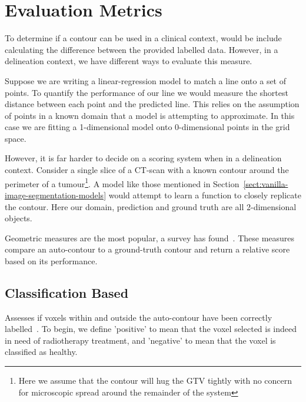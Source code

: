 \documentclass[11pt,twoside]{report}
\begin{document}


\chapter{Evaluation Metrics}\label{sect:evaluation-metrics}

To determine if a contour can be used in a clinical context, would be include calculating the difference between the provided labelled data. However, in a delineation context, we have different ways to evaluate this measure.

Suppose we are writing a linear-regression model to match a line onto a set of points. To quantify the performance of our line we would measure the shortest distance between each point and the predicted line. This relies on the assumption of points in a known domain that a model is attempting to approximate. In this case we are fitting a 1-dimensional model onto 0-dimensional points in the grid space.

However, it is far harder to decide on a scoring system when in a delineation context. Consider a single slice of a CT-scan with a known contour around the perimeter of a tumour\footnote{Here we assume that the contour will hug the GTV tightly with no concern for microscopic spread around the remainder of the system}. A model like those mentioned in Section~\ref{sect:vanilla-image-segmentation-models} would attempt to learn a function to closely replicate the contour. Here our domain, prediction and ground truth are all 2-dimensional objects.

Geometric measures are the most popular, a survey has found~\cite{review-metrics}. These measures compare an auto-contour to a ground-truth contour and return a relative score based on its performance.

\section{Classification Based}\label{sect:classification-based}

Assesses if voxels within and outside the auto-contour have been correctly labelled~\cite{review-metrics}. To begin, we define 'positive' to mean that the voxel selected is indeed in need of radiotherapy treatment, and 'negative' to mean that the voxel is classified as healthy.
\end{document}

